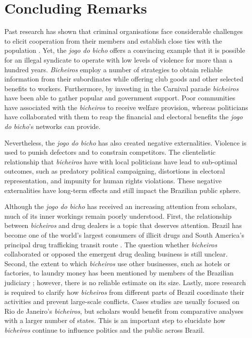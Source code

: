 \documentclass[a4paper,12pt]{article}
\begin{document}
\section{Concluding Remarks}
\label{sec:conclusion3}

Past research has shown that criminal organisations face considerable challenges to elicit cooperation from their members and establish close ties with the population \citep[e.g.][]{gambetta1996sicilian,skarbek2011governance,skarbek2012prison,varese2001russian,varese2011mafias}. Yet, the \textit{jogo do bicho} offers a convincing example that it is possible for an illegal syndicate to operate with low levels of violence for more than a hundred years. \textit{Bicheiros} employ a number of strategies to obtain reliable information from their subordinates while offering club goods and other selected benefits to workers. Furthermore, by investing in the Carnival parade \textit{bicheiros} have been able to gather popular and government support. Poor communities have associated with the \textit{bicheiros} to receive welfare provision, whereas politicians have collaborated with them to reap the financial and electoral benefits the \textit{jogo do bicho}'s networks can provide.

Nevertheless, the \textit{jogo do bicho} has also created negative externalities. Violence is used to punish defectors and to constrain competitors. The clientelistic relationship that \textit{bicheiros} have with local politicians have lead to sub-optimal outcomes, such as predatory political campaigning, distortions in electoral representation, and impunity for human rights violations. These negative externalities have long-term effects and still impact the Brazilian public sphere.

Although the \textit{jogo do bicho} has received an increasing attention from scholars, much of its inner workings remain poorly understood. First, the relationship between \textit{bicheiros} and drug dealers is a topic that deserves attention. Brazil has become one of the world's largest consumers of illicit drugs and South America's principal drug trafficking transit route \citep{miraglia2015drugs,misse2011crime}. The question whether \textit{bicheiros} collaborated or opposed the emergent drug dealing business is still unclear. Second, the extent to which \textit{bicheiros} use other businesses, such as hotels or factories, to laundry money has been mentioned by members of the Brazilian judiciary \citep{globo2012bicheiro,globo2015cacaniquel}; however, there is no reliable estimate on its size. Lastly, more research is required to clarify how \textit{bicheiros} from different parts of Brazil coordinate their activities and prevent large-scale conflicts. Cases studies are usually focused on Rio de Janeiro's \textit{bicheiros}, but scholars would benefit from comparative analyses with a larger number of states. This is an important step to elucidate how \textit{bicheiros} continue to influence politics and the public across Brazil.

\newpage


\end{document}

